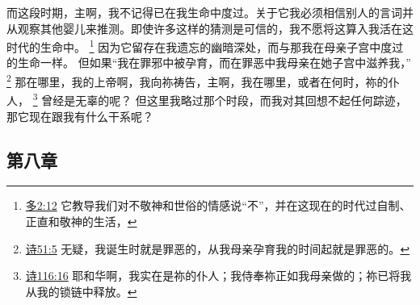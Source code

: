 \documentclass[12pt, a4paper, oneside]{ctexart}
\begin{document}
	而这段时期，主啊，我不记得已在我生命中度过。关于它我必须相信别人的言词并从观察其他婴儿来推测。即使许多这样的猜测是可信的，我不愿将这算入我活在这时代的生命中。
    \footnote {
        \href{https://biblehub.com/titus/2-12.htm}{多2:12} 它教导我们对不敬神和世俗的情感说“不”，并在这现在的时代过自制、正直和敬神的生活，
    }
	因为它留存在我遗忘的幽暗深处，而与那我在母亲子宫中度过的生命一样。
	但如果“我在罪邪中被孕育，而在罪恶中我母亲在她子宫中滋养我，”
    \footnote {
        \href{https://biblehub.com/psalms/51-5.htm}{诗51:5} 无疑，我诞生时就是罪恶的，从我母亲孕育我的时间起就是罪恶的。
    }
    那在哪里，我的上帝啊，我向祢祷告，主啊，我在哪里，或者在何时，祢的仆人，
    \footnote {
        \href{https://biblehub.com/psalms/116-16.htm}{诗116:16} 耶和华啊，我实在是祢的仆人；我侍奉祢正如我母亲做的；祢已将我从我的锁链中释放。
    }
    曾经是无辜的呢？
	但这里我略过那个时段，而我对其回想不起任何踪迹，那它现在跟我有什么干系呢？

\subsection{第八章}
\end{document}
